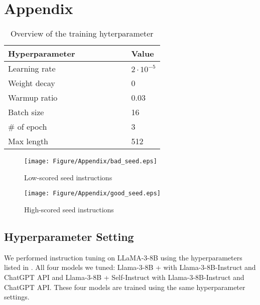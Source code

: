 \appendix
\section{Appendix}


\begin{table}[ht]
\centering
\caption{Overview of the training hyterparameter}
\label{tab:hyperparameter}
\begin{tabular}{lllllll|l}
\textbf{Hyperparameter} &&&&&&& \textbf{Value} \\ \hline
Learning rate           &&&&&&& $2\cdot10^{-5}$\\
Weight decay            &&&&&&& 0              \\
Warmup ratio            &&&&&&& 0.03           \\
Batch size              &&&&&&& 16             \\
\# of epoch             &&&&&&& 3              \\
Max length              &&&&&&& 512           
\end{tabular}%
\end{table}

\begin{figure}[ht]
    \centering
    \texttt{[image: Figure/Appendix/bad\_seed.eps]}
    \caption{Low-scored seed instructions}
    \label{fig:bad-seed}
\end{figure}

\begin{figure}[ht]
    \centering
    \texttt{[image: Figure/Appendix/good\_seed.eps]}
    \caption{High-scored seed instructions}
    \label{fig:good-seed}
\end{figure}




\subsection{Hyperparameter Setting}
We performed instruction tuning on LLaMA-3-8B using the 
hyperparameters listed in . All 
four models we tuned: Llama-3-8B + \ours{} with Llama-3-8B-Instruct and ChatGPT API
and Llama-3-8B + Self-Instruct with Llama-3-8B-Instruct and ChatGPT API.
These four models are trained using
the same hyperparameter settings.


